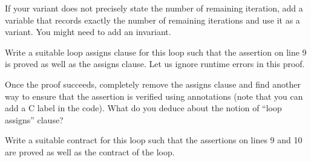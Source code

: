 



If your variant does not precisely state the number of remaining
iteration, add a variable that records exactly the number of remaining
iterations and use it as a variant. You might need to add an invariant.





Write a suitable loop assigns clause for this loop such that the assertion
on line 9 is proved as well as the assigns clause. Let us ignore runtime
errors in this proof.






Once the proof succeeds, completely remove the assigns clause and find
another way to ensure that the assertion is verified using annotations (note
that you can add a C label in the code). What do you deduce about the notion
of ``loop assigns'' clause?





Write a suitable contract for this loop such that the assertions on lines
9 and 10 are proved as well as the contract of the loop.



